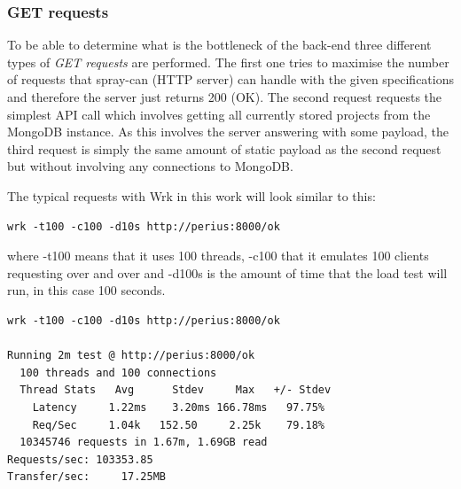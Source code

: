 \documentclass[a4paper,12pt]{article}
\begin{document}
\subsubsection{GET requests} \label{sec:GET_REQUESTS}
To be able to determine what is the bottleneck of the back-end three different types of \textit{GET
requests} are performed. The first one tries to maximise the number of requests that spray-can (HTTP
server) can handle with the given specifications and therefore the server just returns 200 (OK). The
second request requests the simplest API call which involves getting all currently stored projects
from the MongoDB instance. As this involves the server answering with some payload, the third
request is simply the same amount of static payload as the second request but without involving any
connections to MongoDB.
\par
The typical requests with Wrk in this work will look similar to this:
\begin{lstlisting}[frame=single]
wrk -t100 -c100 -d10s http://perius:8000/ok
\end{lstlisting}
where -t100 means that it uses 100 threads, -c100 that it emulates 100 clients requesting over and
over and -d100s is the amount of time that the load test will run, in this case 100 seconds.

\begin{minipage}{\linewidth-1cm}
\begin{lstlisting}[label=OKREQUEST,caption=Result of OK requests]
wrk -t100 -c100 -d10s http://perius:8000/ok

Running 2m test @ http://perius:8000/ok
  100 threads and 100 connections
  Thread Stats   Avg      Stdev     Max   +/- Stdev
    Latency     1.22ms    3.20ms 166.78ms   97.75%
    Req/Sec     1.04k   152.50     2.25k    79.18%
  10345746 requests in 1.67m, 1.69GB read
Requests/sec: 103353.85
Transfer/sec:     17.25MB
\end{lstlisting}
\end{minipage}
\end{document}
